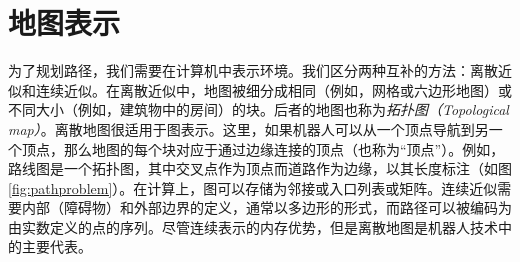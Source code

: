 \section{地图表示}
\label{sec:maps}


为了规划路径，我们需要在计算机中表示环境。我们区分两种互补的方法：离散近似和连续近似。在离散近似中，地图被细分成相同（例如，网格或六边形地图）或不同大小（例如，建筑物中的房间）的块。后者的地图也称为\emph{拓扑图（Topological map）}。离散地图很适用于图表示。这里，如果机器人可以从一个顶点导航到另一个顶点，那么地图的每个块对应于通过边缘连接的顶点（也称为“顶点”）。例如，路线图是一个拓扑图，其中交叉点作为顶点而道路作为边缘，以其长度标注（如图\ref{fig:pathproblem}）。在计算上，图可以存储为邻接或入口列表或矩阵。连续近似需要内部（障碍物）和外部边界的定义，通常以多边形的形式，而路径可以被编码为由实数定义的点的序列。尽管连续表示的内存优势，但是离散地图是机器人技术中的主要代表。

